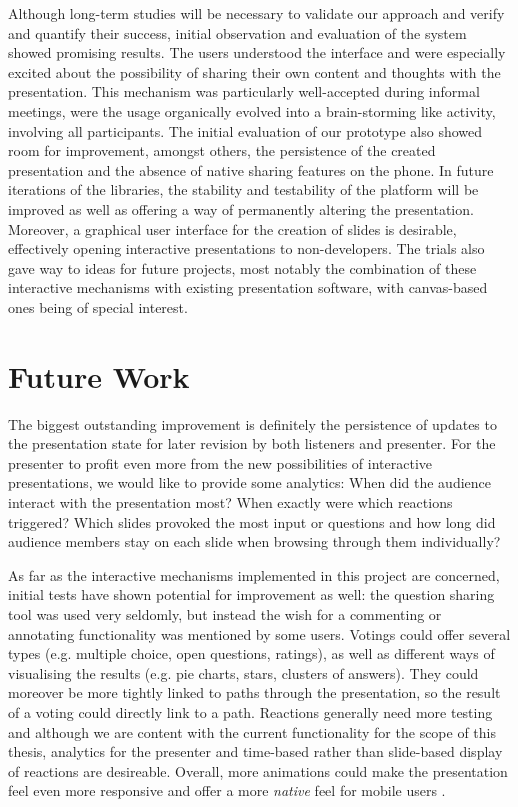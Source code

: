 Although long-term studies will be necessary to validate our approach and verify and quantify their success, initial observation and evaluation of the system showed promising results. The users understood the interface and were especially excited about the possibility of sharing their own content and thoughts with the presentation. This mechanism was particularly well-accepted during informal meetings, were the usage organically evolved into a brain-storming like activity, involving all participants. The initial evaluation of our prototype also showed room for improvement, amongst others, the persistence of the created presentation and the absence of native sharing features on the phone. In future iterations of the libraries, the stability and testability of the platform will be improved as well as offering a way of permanently altering the presentation.
Moreover, a graphical user interface for the creation of slides is desirable, effectively opening interactive presentations to non-developers. The trials also gave way to ideas for future projects, most notably the combination of these interactive mechanisms with existing presentation software, with canvas-based ones being of special interest.

\section{Future Work}
\label{sec:discussion-future-work}

The biggest outstanding improvement is definitely the persistence of updates to the presentation state for later revision by both listeners and presenter. For the presenter to profit even more from the new possibilities of interactive presentations, we would like to provide some analytics: When did the audience interact with the presentation most? When exactly were which reactions triggered? Which slides provoked the most input or questions and how long did audience members stay on each slide when browsing through them individually?

As far as the interactive mechanisms implemented in this project are concerned, initial tests have shown potential for improvement as well: the question sharing tool was used very seldomly, but instead the wish for a commenting or annotating functionality was mentioned by some users. Votings could offer several types (e.g. multiple choice, open questions, ratings), as well as different ways of visualising the results (e.g. pie charts, stars, clusters of answers). They could moreover be more tightly linked to paths through the presentation, so the result of a voting could directly link to a path.
Reactions generally need more testing and although we are content with the current functionality for the scope of this thesis, analytics for the presenter and time-based rather than slide-based display of reactions are desireable.
Overall, more animations could make the presentation feel even more responsive and offer a more \emph{native} feel for mobile users \cite{GoogleMaterialDesignGuide}.


